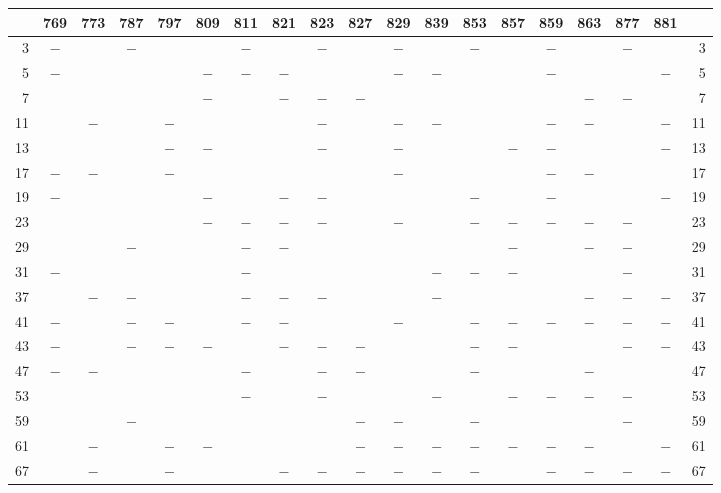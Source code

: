 \clearpage
{}%
\begin{center}\begingroup\fontsize{8}{10.5}\selectfont\setlength{\tabcolsep}{2pt}
\begin{tabular}{r|c|c|c|c|c|c|c|c|c|c|c|c|c|c|c|c|c|r}
\hline
 & 769 & 773 & 787 & 797 & 809 & 811 & 821 & 823 & 827 & 829 & 839 & 853 & 857 & 859 & 863 & 877 & 881 & \\
\hline
3 & $-$ &  & $-$ &  &  & $-$ &  & $-$ &  & $-$ &  & $-$ &  & $-$ &  & $-$ &  & 3\\
5 & $-$ &  &  &  & $-$ & $-$ & $-$ &  &  & $-$ & $-$ &  &  & $-$ &  &  & $-$ & 5\\
7 &  &  &  &  & $-$ &  & $-$ & $-$ & $-$ &  &  &  &  &  & $-$ & $-$ &  & 7\\
11 &  & $-$ &  & $-$ &  &  &  & $-$ &  & $-$ & $-$ &  &  & $-$ & $-$ &  & $-$ & 11\\
13 &  &  &  & $-$ & $-$ &  &  & $-$ &  & $-$ &  &  & $-$ & $-$ &  &  & $-$ & 13\\
17 & $-$ & $-$ &  & $-$ &  &  &  &  &  & $-$ &  &  &  & $-$ & $-$ &  &  & 17\\
19 & $-$ &  &  &  & $-$ &  & $-$ & $-$ &  &  &  & $-$ &  & $-$ &  &  & $-$ & 19\\
23 &  &  &  &  & $-$ & $-$ & $-$ & $-$ &  & $-$ &  & $-$ & $-$ & $-$ & $-$ & $-$ &  & 23\\
29 &  &  & $-$ &  &  & $-$ & $-$ &  &  &  &  &  & $-$ &  & $-$ & $-$ &  & 29\\
31 & $-$ &  &  &  &  & $-$ &  &  &  &  & $-$ & $-$ & $-$ &  &  & $-$ &  & 31\\
37 &  & $-$ & $-$ &  &  & $-$ & $-$ & $-$ &  &  & $-$ &  &  &  & $-$ & $-$ & $-$ & 37\\
41 & $-$ &  & $-$ & $-$ &  & $-$ & $-$ &  &  & $-$ &  & $-$ & $-$ & $-$ & $-$ & $-$ & $-$ & 41\\
43 & $-$ &  & $-$ & $-$ & $-$ &  & $-$ & $-$ & $-$ &  &  & $-$ & $-$ &  &  & $-$ & $-$ & 43\\
47 & $-$ & $-$ &  &  &  & $-$ &  & $-$ & $-$ &  &  & $-$ &  &  & $-$ &  &  & 47\\
53 &  &  &  &  &  & $-$ &  & $-$ &  &  & $-$ &  & $-$ & $-$ & $-$ & $-$ &  & 53\\
59 &  &  & $-$ &  &  &  &  &  & $-$ & $-$ &  & $-$ &  &  &  & $-$ &  & 59\\
61 &  & $-$ &  & $-$ & $-$ &  &  &  & $-$ & $-$ & $-$ & $-$ & $-$ & $-$ & $-$ &  & $-$ & 61\\
67 &  & $-$ &  & $-$ &  &  & $-$ & $-$ & $-$ & $-$ & $-$ & $-$ &  & $-$ & $-$ & $-$ & $-$ & 67\\

\end{tabular}
\end{center}
